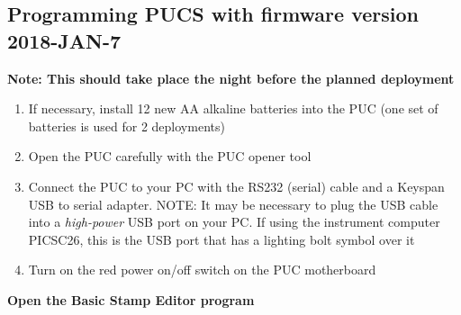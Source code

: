 \documentclass[]{book}
\begin{document}
\hypertarget{programming-pucs-with-firmware-version-2018-jan-7}{%
\subsection{Programming PUCS with firmware version 2018-JAN-7}\label{programming-pucs-with-firmware-version-2018-jan-7}}

\textbf{Note: This should take place the night before the planned deployment}

\begin{enumerate}
\def\labelenumi{\arabic{enumi}.}
\item
  If necessary, install 12 new AA alkaline batteries into the PUC (one set of batteries is used for 2 deployments)
\item
  Open the PUC carefully with the PUC opener tool
\item
  Connect the PUC to your PC with the RS232 (serial) cable and a Keyspan USB to serial adapter. NOTE: It may be necessary to plug the USB cable into a \emph{high-power} USB port on your PC. If using the instrument computer PICSC26, this is the USB port that has a lighting bolt symbol over it
\item
  Turn on the red power on/off switch on the PUC motherboard
\end{enumerate}

\textbf{Open the Basic Stamp Editor program}
\end{document}
